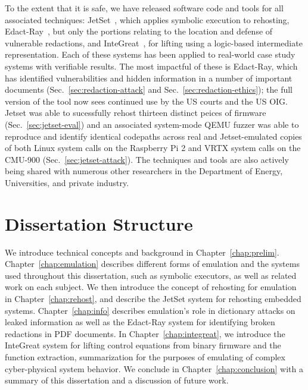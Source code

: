 To the extent that it is safe, we have released software code and tools for all associated techniques: JetSet~\cite{jetsetsource}, which applies symbolic execution to rehosting, Edact-Ray~\cite{deredactionsource}, but only the portions relating to the location and defense of vulnerable redactions, and InteGreat~\cite{integreat}, for lifting using a logic-based intermediate representation.
Each of these systems has been applied to real-world case study systems with verifiable results.
The most impactful of these is Edact-Ray, which has identified vulnerabilities and hidden information in a number of important documents (Sec.~\ref{sec:redaction-attack} and Sec.~\ref{sec:redaction-ethics}); the full version of the tool now sees continued use by the US courts and the US OIG.
Jetset was able to sucessfully rehost thirteen distinct peices of firmware (Sec.~\ref{sec:jetset-eval}) and an associated system-mode QEMU fuzzer was able to reproduce and identify identical codepaths across real and Jetset-emulated copies of both Linux system calls on the Raspberry Pi 2 and VRTX system calls on the CMU-900 (Sec.~\ref{sec:jetset-attack}).
The techniques and tools are also actively being shared with numerous other researchers in the Department of Energy, Universities, and private industry.

\section{Dissertation Structure}

We introduce technical concepts and background in Chapter~\ref{chap:prelim}.
Chapter~\ref{chap:emulation} describes different forms of emulation and the systems used throughout this dissertation, such as symbolic executors, as well as related work on each subject.
We then introduce the concept of rehosting for emulation in Chapter~\ref{chap:rehost}, and describe the JetSet system for rehosting embedded systems.
Chapter~\ref{chap:info} describes emulation's role in dictionary attacks on leaked information as well as the Edact-Ray system for identifying broken redactions in PDF documents.
In Chapter~\ref{chap:integreat}, we introduce the InteGreat system for lifting control equations from binary firmware and the function extraction, summarization for the purposes of emulating of complex cyber-physical system behavior.
We conclude in Chapter~\ref{chap:conclusion} with a summary of this dissertation and a discussion of future work.
